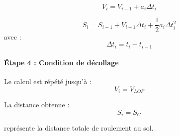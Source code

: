 		\[	V_i=V_{i-1}+a_i\Delta t_i	\]
		
		\[	S_i=S_{i-1}	+ V_{i-1}\Delta t_i + \frac{1}{2}a_i\Delta t_i^2 \]		avec :	\[	\Delta t_i=t_i-t_{i-1}	\]
		
		\paragraph{Étape 4 : Condition de décollage}
		
		Le calcul est répété jusqu’à :	\[	V_i=V_{LOF}	\]
		
		La distance obtenue :		\[	S_i=S_G	\]
		
		représente la distance totale de roulement au sol.
		
		
		
		
		
		
		
		
		
		
		
		
